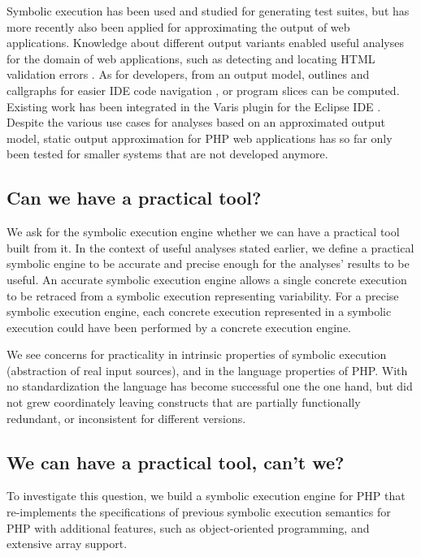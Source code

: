 \documentclass[preprint]{sig-alternate-05-2015}
\begin{document}
Symbolic execution has been used and studied for generating test suites, but has more recently also been applied for approximating the output of web applications. Knowledge about different output variants enabled useful analyses for the domain of web applications, such as detecting and locating HTML validation errors \cite{Nguyen:2011:AFH:2190078.2190142}. As for developers, from an output model, outlines and callgraphs for easier IDE code navigation \cite{Nguyen:2014:BCG:2635868.2635928}, or program slices \cite{Nguyen:2015:CPS:2786805.2786872} can be computed. Existing work has been integrated in the Varis plugin for the Eclipse IDE \cite{Nguyen:2015:VIS:2819009.2819140}. Despite the various use cases for analyses based on an approximated output model, static output approximation for PHP web applications has so far only been tested for smaller systems that are not developed anymore.

\subsection*{Can we have a practical tool?}
We ask for the symbolic execution engine whether we can have a practical tool built from it. In the context of useful analyses stated earlier, we define a practical symbolic engine to be accurate and precise enough for the analyses' results to be useful. 
An accurate symbolic execution engine allows a single concrete execution to be retraced from a symbolic execution representing variability. For a precise symbolic execution engine, each concrete execution represented in a symbolic execution could have been performed by a concrete execution engine.

We see concerns for practicality in intrinsic properties of symbolic execution (abstraction of real input sources), and in the language properties of PHP. With no standardization the language has become successful one the one hand, but did not grew coordinately leaving constructs that are partially  functionally redundant, or inconsistent for different versions.  

\subsection*{We can have a practical tool, can't we?}
To investigate this question, we build a symbolic execution engine for PHP that re-implements the specifications of previous symbolic execution semantics \cite{Nguyen:2014:BCG:2635868.2635928} for PHP with additional features, such as object-oriented programming, and extensive array support. 
\end{document}
